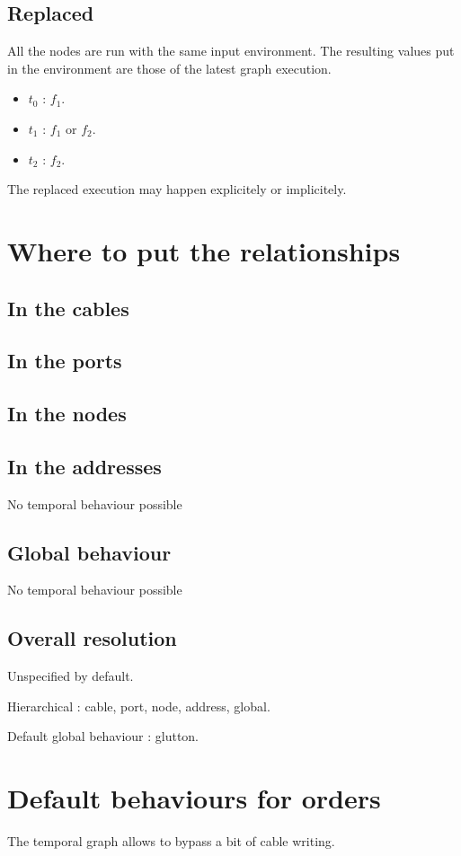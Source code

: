 \documentclass{article}
\begin{document}
	\subsection{Replaced}
	All the nodes are run with the same input environment. 
	The resulting values put in the environment are those of the latest graph execution.
	 
    \begin{itemize}
        \item $t_0$ : $f_1$.
        \item $t_1$ : $f_1$ or $f_2$.
        \item $t_2$ : $f_2$. 
    \end{itemize}

    The replaced execution may happen explicitely or implicitely.
    
    \section{Where to put the relationships}
    \subsection{In the cables}
    \subsection{In the ports}
    \subsection{In the nodes}
    \subsection{In the addresses}
    No temporal behaviour possible
    \subsection{Global behaviour}
    No temporal behaviour possible
    \subsection{Overall resolution}
    Unspecified by default. 
    
    Hierarchical : cable, port, node, address, global.
    
    Default global behaviour : glutton.
    
    
    
    \section{Default behaviours for orders}
    The temporal graph allows to bypass a bit of cable writing.
    
\end{document}
